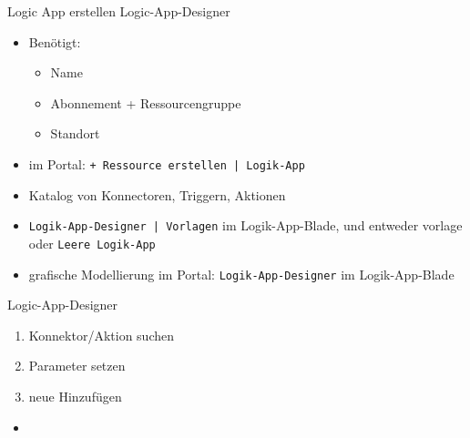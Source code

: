 \begin{flashcard}[Definition]{Logic App erstellen}
    Logic-App-Designer
    \begin{itemize}
        \item Benötigt:
            \begin{itemize}
                \item Name
                \item Abonnement + Ressourcengruppe
                \item Standort
            \end{itemize}
        \item im Portal: \texttt{+ Ressource erstellen | Logik-App}\newline
        \item Katalog von Konnectoren, Triggern, Aktionen
        \item \texttt{Logik-App-Designer | Vorlagen} im Logik-App-Blade, und entweder vorlage oder \texttt{Leere Logik-App}
        \item grafische Modellierung im Portal: \texttt{Logik-App-Designer} im Logik-App-Blade
    \end{itemize}
\end{flashcard}

\begin{flashcard}[Definition]{Logic-App-Designer}
    \begin{enumerate}
        \item Konnektor/Aktion suchen
        \item Parameter setzen
        \item neue Hinzufügen
    \end{enumerate}
\end{flashcard}

\begin{flashcard}[Definition]{}
    \begin{itemize}
        \item
    \end{itemize}
\end{flashcard}

